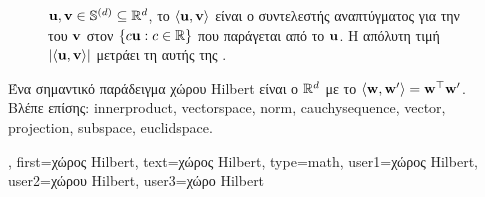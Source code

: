 {{\begin{figure}[H]
{{			${\bf u}, {\bf v} \in \mathbb{S}^{(d)} \subseteq \mathbb{R}^{d}$, \foreignlanguage{greek}{το}
			 $\langle {\bf u}, {\bf v} \rangle$ \foreignlanguage{greek}{είναι ο συντελεστής αναπτύγματος 
			για την}  \foreignlanguage{greek}{του ${\bf v}$ στον}  
			$\{ c {\bf u}: c \in \mathbb{R} \}$ \foreignlanguage{greek}{που παράγεται από το ${\bf u}$. 
			Η απόλυτη τιμή $|\langle {\bf u}, {\bf v} \rangle|$ μετράει τη}  \foreignlanguage{greek}{αυτής 
			της} . \label{fig_hilbertspace_dict}} }
		\end{figure}
		\foreignlanguage{greek}{Ένα σημαντικό παράδειγμα χώρου} Hilbert \foreignlanguage{greek}{είναι ο}  
		$\mathbb{R}^{d}$ \foreignlanguage{greek}{με το}  
		$\langle {\bf w}, {\bf w}' \rangle = {\bf w}^{\top} {\bf w}'$.
		\\
		\foreignlanguage{greek}{Βλέπε επίσης:} \gls{innerproduct}, \gls{vectorspace}, \gls{norm}, \gls{cauchysequence}, 
		\gls{vector}, \gls{projection}, \gls{subspace}, \gls{euclidspace}.},
	first={\foreignlanguage{greek}{χώρος} Hilbert},
	text={\foreignlanguage{greek}{χώρος} Hilbert},
	type=math,
	user1={\foreignlanguage{greek}{χώρος} Hilbert}, %
	user2={\foreignlanguage{greek}{χώρου} Hilbert}, %
	user3={\foreignlanguage{greek}{χώρο} Hilbert} %
}

